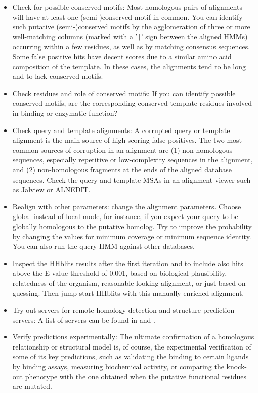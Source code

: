 \documentclass[11pt,a4paper]{article}
\begin{document}
\begin{itemize}
\item{Check for possible conserved motifs: Most homologous pairs of alignments will have at least one (semi-)conserved motif in common. You can identify such putative (semi-)conserved motifs by the agglomeration of three or more well-matching columns (marked with a '\verb`|`' sign between the aligned HMMs) occurring within a few residues, as well as by matching consensus sequences. Some false positive hits have decent scores due to a similar amino acid composition of the template. In these cases, the alignments tend to be long and to lack conserved motifs.}

\item{Check residues and role of conserved motifs: If you can identify possible conserved motifs, are the corresponding conserved template residues involved in binding or enzymatic function?}

\item{Check query and template alignments: A corrupted query or template alignment is the main source of high-scoring false positives. The two most common sources of corruption in an alignment are (1) non-homologous sequences, especially repetitive or low-complexity sequences in the alignment, and (2) non-homologous fragments at the ends of the aligned database sequences. Check the query and template MSAs in an alignment viewer such as Jalview or ALNEDIT.}

\item{Realign with other parameters: change the alignment parameters. Choose global instead of local mode, for instance, if you expect your query to be globally homologous to the putative homolog. Try to improve the probability by changing the values for minimum coverage or minimum sequence identity. You can also run the query HMM against other databases.}

\item{Inspect the  HHblits results after the first iteration and to include also hits above the E-value threshold of 0.001, based on biological plausibility, relatedness of the organism, reasonable looking alignment, or just based on guessing. Then jump-start HHblits with this manually enriched alignment.}

\item{Try out servers for remote homology detection and structure prediction servers: A list of servers can be found in \cite{Mariani:2011} and \cite{Battey:2007}.}

\item{Verify predictions experimentally: The ultimate confirmation of a homologous relationship or structural model is, of course, the experimental verification of some of its key predictions, such as validating the binding to certain ligands by binding assays, measuring biochemical activity, or comparing the knock-out phenotype with the one obtained when the putative functional residues are mutated.}
\end{itemize}
\end{document}
